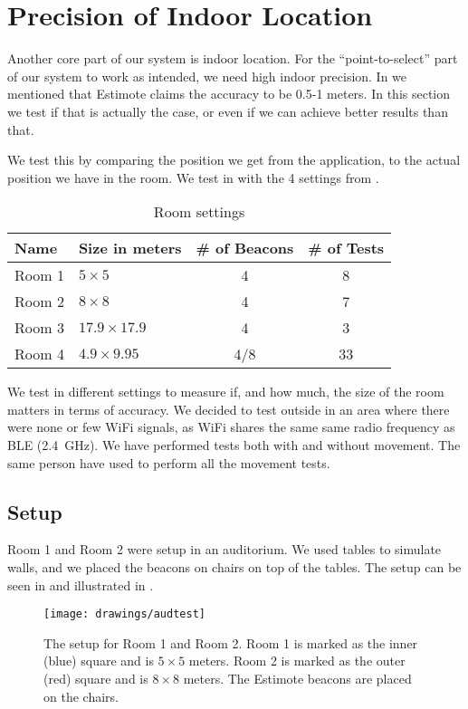 \section{Precision of Indoor Location}\label{sec:estimoteprecision}
Another core part of our system is indoor location. 
For the ``point-to-select'' part of our system to work as intended, 
we need high indoor precision. 
In  we mentioned that Estimote claims the accuracy to be \num{0.5}-\num{1} meters.
In this section we test if that is actually the case, 
or even if we can achieve better results than that. 

We test this by comparing the position we get from the application, 
to the actual position we have in the room. 
We test in with the \num{4} settings from .

\begin{table}
    \centering
    \begin{tabular}{l| l c c}
        Name & Size in meters & \# of Beacons & \# of Tests\\ \hline
        Room 1 & $5 \times 5$ & 4 & 8 \\
        Room 2 & $8 \times 8$ & 4 & 7 \\
        Room 3 & $17.9 \times 17.9$ & 4 & 3 \\
        Room 4 & $4.9 \times 9.95$ & 4/8 &  33
    \end{tabular}
    \caption{Room settings}
    \label{table:rooms}
\end{table}

We test in different settings to measure if, and how much, 
the size of the room matters in terms of accuracy. 
We decided to test outside in an area where there were none or few WiFi signals,
as WiFi shares the same same radio frequency as BLE (\SI{2.4}{\GHz}). 
We have performed tests both with and without movement. 
The same person have used to perform all the movement tests. 

\subsection{Setup}
Room 1 and Room 2 were setup in an auditorium. 
We used tables to simulate walls, 
and we placed the beacons on chairs on top of the tables. 
The setup can be seen in  and illustrated in . 
\begin{figure}[!htb]
    \centering
    \texttt{[image: drawings/audtest]}
    \caption{The setup for Room 1 and Room 2. Room 1 is marked as the inner (blue) square and is $5 \times 5$ meters. Room 2 is marked as the outer (red) square and is $8 \times 8$ meters. The Estimote beacons are placed on the chairs.}
    \label{fig:audtest}
\end{figure}

